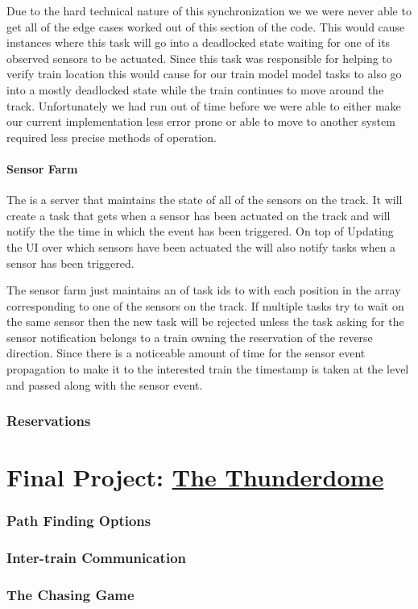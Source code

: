 \documentclass[pdftex,10pt,a4paper]{article}
\begin{document}
Due to the hard technical nature of this synchronization we we were never able
to get all of the edge cases worked out of this section of the code. This would
cause instances where this task will go into a deadlocked state waiting for one
of its observed sensors to be actuated. Since this task was responsible for
helping to verify train location this would cause for our train model model
tasks to also go into a mostly deadlocked state while the train continues to
move around the track. Unfortunately we had run out of time before we were able
to either make our current implementation less error prone or able to move to
another system required less precise methods of operation.

\subsection*{Sensor Farm}

The  is a server that maintains the state of all of the
sensors on the track. It will create a task  that gets when
a sensor has been actuated on the track and will notify the 
the time in which the event has been triggered. On top of Updating the UI over
which sensors have been actuated the  will also notify tasks
when a sensor has been triggered.

The sensor farm just maintains an of task ids to with each position in the
array corresponding to one of the sensors on the track. If multiple tasks try
to wait on the same sensor then the new task will be rejected unless the task
asking for the sensor notification belongs to a train owning the reservation of
the reverse direction. Since there is a noticeable amount of time for the
sensor event propagation to make it to the interested train the timestamp is
taken at the  level and passed along with the sensor event.

\section*{Reservations}

\part*{Final Project: \underline{The Thunderdome}}

\section*{Path Finding Options}

\section*{Inter-train Communication}

\section*{The Chasing Game}
\end{document}
